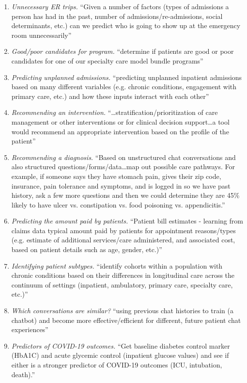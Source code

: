 \begin{enumerate}
\item \textit{Unnecessary ER trips.} ``Given a number of factors (types of admissions a person has had in the past, number of admissions/re-admissions, social determinants, etc.) can we predict who is going to show up at the emergency room unnecessarily''
\item \textit{Good/poor candidates for program.} ``determine if patients are good or poor candidates for one of our specialty care model bundle programs''
\item \textit{Predicting unplanned admissions.} ``predicting unplanned inpatient admissions based on many different variables (e.g. chronic conditions, engagement with primary care, etc.) and how these inputs interact with each other''
\item \textit{Recommending an intervention.} ``\dots stratification/prioritization of care management or other interventions or for clinical decision support\dots a tool would recommend an appropriate intervention based on the profile of the patient''
\item \textit{Recommending a diagnosis.} ``Based on unstructured chat conversations and also structured questions/forms/data\dots map out possible care pathways. For example, if someone says they have stomach pain, gives their zip code, insurance, pain tolerance and symptoms, and is logged in so we have past history, ask a few more questions and then we could determine they are 45\% likely to have ulcer vs. constipation vs. food poisoning vs. appendicitis.''
\item \textit{Predicting the amount paid by patients.} ``Patient bill estimates - learning from claims data typical amount paid by patients for appointment reasons/types (e.g. estimate of additional services/care administered, and associated cost, based on patient details such as age, gender, etc.)''
\item \textit{Identifying patient subtypes.} ``identify cohorts within a population with chronic conditions based on their differences in longitudinal care across the continuum of settings (inpatient, ambulatory, primary care, specialty care, etc.)''
\item \textit{Which conversations are similar?} ``using previous chat histories to train (a chatbot) and become more effective/efficient for different, future patient chat experiences''
\item \textit{Predictors of COVID-19 outcomes.} ``Get baseline diabetes control marker (HbA1C) and acute glycemic control (inpatient glucose values) and see if either is a stronger predictor of COVID-19 outcomes (ICU, intubation, death).''

\end{enumerate}
